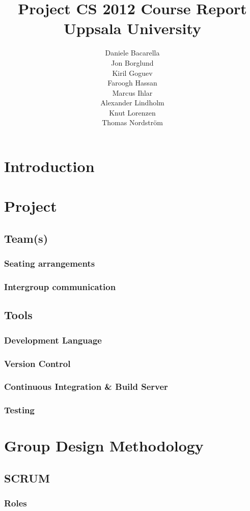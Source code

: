 \documentclass[11pt]{report}
\title{Project CS 2012 Course Report\\Uppsala University\\}
\author{Daniele Bacarella\\
Jon Borglund\\
Kiril Goguev\\
		Faroogh Hassan\\
		Marcus Ihlar\\
		Alexander Lindholm\\
		Knut Lorenzen\\
		Thomas Nordström\\
}
\date{}
\begin{document}
\maketitle

\tableofcontents

\chapter{Introduction}
\chapter{Project}
\section{Team(s)}
\subsection{Seating arrangements}
\subsection{Intergroup communication}
\section{Tools}
\subsection{Development Language}
\subsection{Version Control}
\subsection{Continuous Integration \& Build Server}
\subsection{Testing}
\chapter{Group Design Methodology}
\section{SCRUM}
\subsection{Roles}
\end{document}
